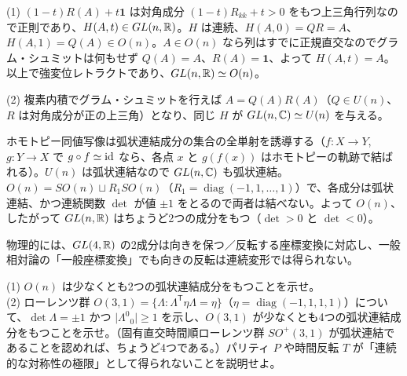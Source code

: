 \begin{solution}
(1) $(1-t)R(A)+t\mathbf 1$ は対角成分 $(1-t)R_{kk}+t>0$ をもつ上三角行列なので正則であり、$H(A,t)\in GL(n,\mathbb{R})$。$H$ は連続、$H(A,0)=QR=A$、$H(A,1)=Q(A)\in O(n)$。$A\in O(n)$ なら列はすでに正規直交なのでグラム・シュミットは何もせず $Q(A)=A$、$R(A)=\mathbf 1$、よって $H(A,t)=A$。以上で強変位レトラクトであり、$GL(n,\mathbb{R})\simeq O(n)$。

(2) 複素内積でグラム・シュミットを行えば $A=Q(A)R(A)$（$Q\in U(n)$、$R$ は対角成分が正の上三角）となり、同じ $H$ が $GL(n,\mathbb{C})\simeq U(n)$ を与える。

ホモトピー同値写像は弧状連結成分の集合の全単射を誘導する（$f\colon X\to Y$, $g\colon Y\to X$ で $g\circ f\simeq\mathrm{id}$ なら、各点 $x$ と $g(f(x))$ はホモトピーの軌跡で結ばれる）。$U(n)$ は弧状連結なので $GL(n,\mathbb{C})$ も弧状連結。$O(n)=SO(n)\sqcup R_1SO(n)$（$R_1=\operatorname{diag}(-1,1,\dots,1)$）で、各成分は弧状連結、かつ連続関数 $\det$ が値 $\pm1$ をとるので両者は結べない。よって $O(n)$、したがって $GL(n,\mathbb{R})$ はちょうど2つの成分をもつ（$\det>0$ と $\det<0$）。

物理的には、$GL(4,\mathbb{R})$ の2成分は向きを保つ／反転する座標変換に対応し、一般相対論の「一般座標変換」でも向きの反転は連続変形では得られない。
\end{solution}

\begin{problem}[難易度 A]\label{ch01-prob-lorentz}
(1) $O(n)$ は少なくとも2つの弧状連結成分をもつことを示せ。\\
(2) ローレンツ群 $O(3,1)=\{\Lambda:\Lambda^{\mathsf T}\eta\Lambda=\eta\}$（$\eta=\operatorname{diag}(-1,1,1,1)$）について、$\det\Lambda=\pm1$ かつ $\lvert\Lambda^0{}_0\rvert\ge1$ を示し、$O(3,1)$ が少なくとも4つの弧状連結成分をもつことを示せ。（固有直交時間順ローレンツ群 $SO^+(3,1)$ が弧状連結であることを認めれば、ちょうど4つである。）パリティ $P$ や時間反転 $T$ が「連続的な対称性の極限」として得られないことを説明せよ。
\end{problem}

